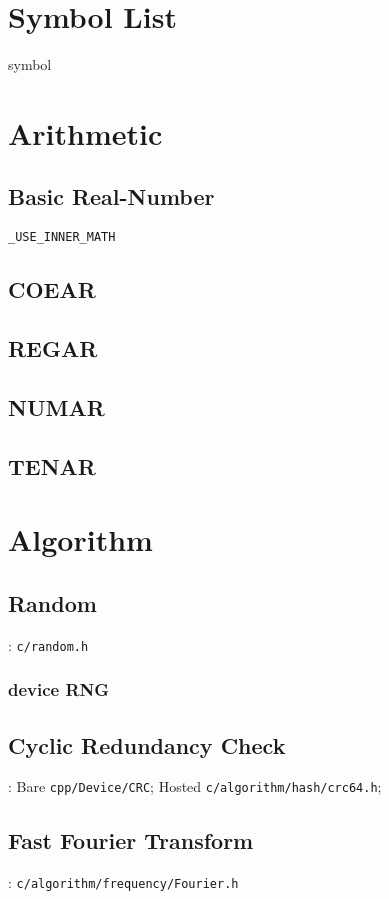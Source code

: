 
\section{Symbol List}
{symbol}

\section{Arithmetic}

\subsection{Basic Real-Number}

\verb|_USE_INNER_MATH|

\subsection{COEAR}

\subsection{REGAR}

\subsection{NUMAR}

\subsection{TENAR}

\section{Algorithm}

\subsection{Random}
: \verb`c/random.h`

\subsubsection{device RNG}

\subsection{Cyclic Redundancy Check}

:
Bare \verb`cpp/Device/CRC`;
Hosted \verb`c/algorithm/hash/crc64.h`;

\subsection{Fast Fourier Transform}

: \verb`c/algorithm/frequency/Fourier.h`

